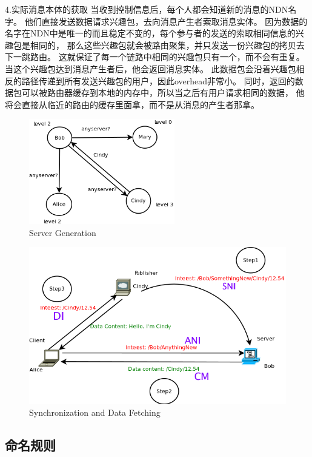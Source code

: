 \documentclass[a4paper]{article}
\begin{document}
4.实际消息本体的获取
当收到控制信息后，每个人都会知道新的消息的NDN名字。
他们直接发送数据请求兴趣包，去向消息产生者索取消息实体。
因为数据的名字在NDN中是唯一的而且稳定不变的，每个参与者的发送的索取相同信息的兴趣包是相同的，
那么这些兴趣包就会被路由聚集，并只发送一份兴趣包的拷贝去下一跳路由。
这就保证了每一个链路中相同的兴趣包只有一个，而不会有重复。当这个兴趣包达到消息产生者后，他会返回消息实体。
此数据包会沿着兴趣包相反的路径传递到所有发送兴趣包的用户，因此overhead非常小。
同时，返回的数据包可以被路由器缓存到本地的内存中，所以当之后有用户请求相同的数据，
他将会直接从临近的路由的缓存里面拿，而不是从消息的产生者那拿。

\begin{figure}[!t]
\centering
\includegraphics[width=2.5in]{../png/server-generation.png}
\caption{Server Generation}
\label{server_generation}
\end{figure}

\begin{figure}[!t]
\centering
\includegraphics[width=4.5in]{../png/synchronization.png}
\caption{Synchronization and Data Fetching}
\label{synchronization}
\end{figure}

\subsection{命名规则}
\end{document}
